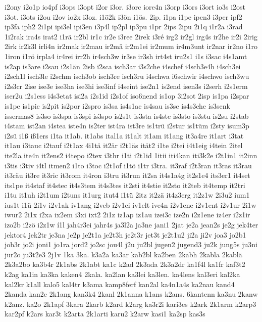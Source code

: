 {i2ony
i2o1p
io4pf
i3ops
i3opt
i2or
i3or.
i3orc
iore4n
i3orp
i3ors
i3ort
io3s
i2ost
i3ot.
i3ots
i2ou
i2ov
io2x
i3oz.
i1ö2k
i3ön
i1ös.
2ip.
i1pa
i1pe
ipen3
i3per
ipf2
ip3fa
iph2
2i1pi
ipi3el
ipi3en
i3p4l
ip2pl
ip3pu
i1pr
2ips
2ipu
2i1q
i1r2a
i3rad
1i2rak
ira4s
irat2
i1rä
ir2bl
ir1c
ir2e
i3ree
2irek
i3ré
irg2
ir2gl
irg4s
ir2he
ir2i
2irig
2irk
ir2k3l
irli4n
ir2mak
ir2mau
ir2mä
ir2m1ei
ir2mum
ir4m3unt
ir2nar
ir2no
i1ro
1iron
i1rö
irpla4
ir4rei
irr2h
ir4sch3w
ir3se
ir3sh
irt4st
iru2s1
i1s
i3sac
i4s1amt
is2ap
is3are
i2sau
i2s1än
2isb
i2sca
isch3ar
i3s2che
i4schef
i4sch3e4h
i4sch3ei
i2sch1l
isch3le
i2schm
isch3ob
isch3re
isch3ru
i4schwa
i6schwir
i4schwo
isch3wu
i2s3cr
2ise
ise3e
ise3ha
ise3hi
ise3inf
i4seint
ise2n1
is2end
isen3s
i2serh
i2s1erm
iser2u
i2s1ess
i4s3etat
isi2a
i2s1id
i2s1of
iso6nend
is1op
3i2sot
2isp
is1pa
i2spar
is1pe
is1pic
is2pit
is2por
i2spro
is3sa
is4s1ac
is4sau
is3sc
is4s3che
is3senk
issermas8
is3so
is3spa
is3spi
is3spo
is2s1t
is3sta
is4ste
is3sto
is3stu
is2su
i2stab
i4stam
ist2an
i4stea
iste4n
is2ter
ist4ra
ist3re
is1trü
i2stur
is1tüm
i2sty
isum3p
i2sü
i1ß
iß1ers
i1ta
it1ab.
it1abs
ital1a
it1alt
it1am
it1ang
it3a4re
it1art
i3tat
it1au
i3tauc
i2tauf
i2t1ax
4i1tä
it2är
i2t1äs
ität2
i1te
i2tei
i4t1eig
i4tein
2itel
ite2la
ite4n
it2ens2
i4tepo
i2tex
i3thr
i1ti
i2t1id
1itii
iti4kan
iti3k2e
i2t1in1
it2inn
i3tis
i3tiv
i4tl
itmen2
i1to
i3toc
i2t1of
i1tö
i1tr
i3tra.
it3raf
i2t3ran
it3ras
it3rau
it3räu
it3re
it3ric
it3rom
it4ron
i3tru
it3run
it2sa
it4s1a4g
it2s1e4
its3er1
it4set
its1pe
it4staf
it4stec
it4s3tem
it4s3tes
it2sti
it4stie
it2sto
it2teb
it4temp
it2tri
i1tu
it1uh
i2t1um
i2tuns
it1urg
itut4
i1tü
2itz
it2zä
it4z3erg
it2z1w
2i3u2
ium1
ius1t
i1ü
2i1v
i2v1ak
iv1ang
i2veb
i2v1ei
iv1elt
ive4n
i2v1ene
i2v1ent
i2v1ur
2i1w
iwur2
2i1x
i2xa
ix2em
i3xi
ixt2
2i1z
iz1ap
iz1au
izei3c
ize2n
i2z1ene
iz4er
i2z1ir
izo2b
i2zö
i2z1w
í1l
jah4r3ei
jahr4s
ja3l2a
ja3ne
jani1
2jat
je2a
jean2s
je2g
jek4ter
jektor4
jek2tr
je3na
je2p
je2t1a
je2t3h
je2t3r
jet3t
je2t1u2
ji2a
ji2v
joa3
jo2b1
job3r
jo2i
joni1
jo1ra
jord2
jo2sc
jou4l
j2u
ju2bl
jugen2
jugend3
ju2k
jung5s
ju3ni
jur2o
ju3t2e3
2j1v
1ka
3ka.
k3a2a
ka3ar
kab2bl
ka2ben
2kabh
2kabla
2kablä
2k3a2bo
ka3b4r
2k1abs
2k1abt
ka1c
k2ad
2k3ada
2k3a2dr
ka1f4l
ka1fr
kaf3t2
k2ag
ka1in
ka3ka
kaken4
2kala.
ka2lan
ka3lei
ka3len.
ka4lens
kal3eri
kal2ka
kal2kr
k1all
kalo5
kal4tr
k3ama
kamp8ferf
kan2al
ka4n1a4s
ka2nau
kand4
2kanda
kan2e
2k1ang
kan3k4
2kanl
2k1anna
k1ans
k2ans.
6kantenn
ka3nu
2kanw
k2anz.
ka2o
2k1apf
3kara
2karb
k2ard
k2arg
ka3r2i
kari3es
k2ark
2k1arm
k2arp3
kar2pf
k2ars
kar3t
k2arta
2k1arti
karu2
k2arw
kasi1
ka2sp
kas3s
}
